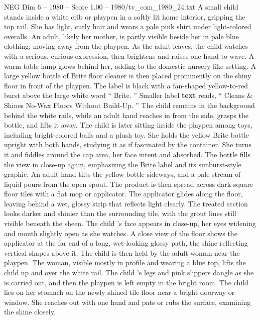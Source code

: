 \begin{textsample}{NEG Dim 6 – 1980 – Score 1.00 – 1980/tv\_com\_1980\_24.txt}  \label{ex:f6_neg_065}
A small child stands inside a white crib or playpen in a softly lit home interior, gripping the top rail.
She has light, curly hair and wears a pale pink shirt under light-colored overalls.
An adult, likely her mother, is partly visible beside her in pale blue clothing, moving away from the playpen.
As the adult leaves, the child watches with a serious, curious expression, then brightens and raises one hand to wave.
A warm table lamp glows behind her, adding to the domestic nursery-like setting.
A large yellow bottle of Brite floor cleaner is then placed prominently on the shiny floor in front of the playpen.
The label is black with a fan-shaped yellow-to-red burst above the large white word “ Brite. ” Smaller label \textbf{text} reads, “ Cleans \& Shines No-Wax Floors Without Build-Up. ” The child remains in the background behind the white rails, while an adult hand reaches in from the side, grasps the bottle, and lifts it away.
The child is later sitting inside the playpen among toys, including bright-colored balls and a plush toy.
She holds the yellow Brite bottle upright with both hands, studying it as if fascinated by the container.
She turns it and fiddles around the cap area, her face intent and absorbed.
The bottle fills the view in close-up again, emphasizing the Brite label and its sunburst-style graphic.
An adult hand tilts the yellow bottle sideways, and a pale stream of liquid pours from the open spout.
The product is then spread across dark square floor tiles with a flat mop or applicator.
The applicator glides along the floor, leaving behind a wet, glossy strip that reflects light clearly.
The treated section looks darker and shinier than the surrounding tile, with the grout lines still visible beneath the sheen.
The child ’s face appears in close-up, her eyes widening and mouth slightly open as she watches.
A close view of the floor shows the applicator at the far end of a long, wet-looking glossy path, the shine reflecting vertical shapes above it.
The child is then held by the adult woman near the playpen.
The woman, visible mostly in profile and wearing a blue top, lifts the child up and over the white rail.
The child ’s legs and pink slippers dangle as she is carried out, and then the playpen is left empty in the bright room.
The child lies on her stomach on the newly shined tile floor near a bright doorway or window.
She reaches out with one hand and pats or rubs the surface, examining the shine closely.

\end{textsample}
